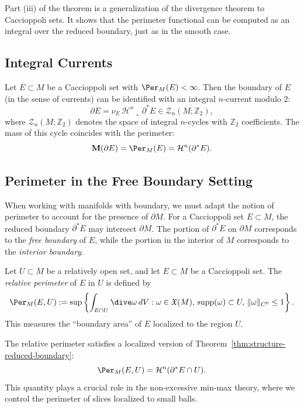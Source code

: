 Part (iii) of the theorem is a generalization of the divergence theorem to Caccioppoli sets. It shows
that the perimeter functional can be computed as an integral over the reduced boundary, just as in the
smooth case.

\subsection{Integral Currents}\label{subsec:caccioppoli-currents}

\begin{theorem}\label{thm:caccioppoli-cycles}
Let $E \subset M$ be a Caccioppoli set with $\Per_M(E) < \infty$. Then the boundary of $E$ (in the
sense of currents) can be identified with an integral $n$-current modulo $2$:
\[
    \partial E = \nu_E \, \mathcal{H}^n \llcorner \partial^* E \in \mathcal{Z}_n(M; \mathbb{Z}_2),
\]
where $\mathcal{Z}_n(M; \mathbb{Z}_2)$ denotes the space of integral $n$-cycles with $\mathbb{Z}_2$
coefficients. The mass of this cycle coincides with the perimeter:
\[
    \mathbf{M}(\partial E) = \Per_M(E) = \mathcal{H}^n(\partial^* E).
\]
\end{theorem}

\subsection{Perimeter in the Free Boundary Setting}\label{subsec:perimeter-free-boundary}

When working with manifolds with boundary, we must adapt the notion of perimeter to account for the presence of $\partial M$. For a Caccioppoli set $E \subset M$, the reduced boundary $\partial^* E$ may intersect $\partial M$. The portion of $\partial^* E$ on $\partial M$ corresponds to the \emph{free boundary} of $E$, while the portion in the interior of $M$ corresponds to the \emph{interior boundary}.

\begin{definition}\label{def:relative-perimeter}
Let $U \subset M$ be a relatively open set, and let $E \subset M$ be a Caccioppoli set. The \emph{relative perimeter} of $E$ in $U$ is defined by
\[
    \Per_M(E, U) := \sup\left\{ \int_{E \cap U} \dive \omega\, dV : \omega \in \mathfrak{X}(M),\,
    \mathrm{supp}(\omega) \subset U,\, \|\omega\|_{C^0} \leq 1 \right\}.
\]
This measures the ``boundary area'' of $E$ localized to the region $U$.
\end{definition}
The relative perimeter satisfies a localized version of Theorem~\ref{thm:structure-reduced-boundary}:
\[
    \Per_M(E, U) = \mathcal{H}^n(\partial^* E \cap U).
\]
This quantity plays a crucial role in the non-excessive min-max theory, where we control the perimeter
of slices localized to small balls.

